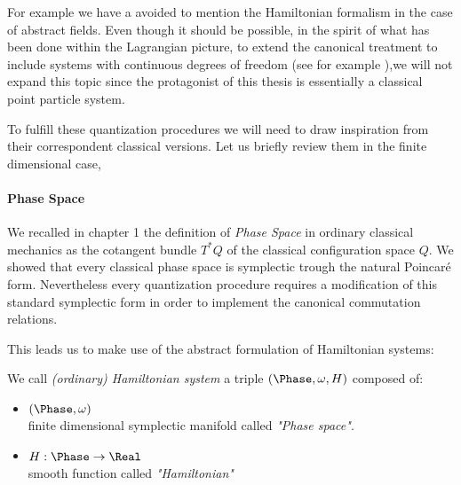 \documentclass[Main]{subfiles}
\begin{document}
	For example we have a avoided to mention the Hamiltonian formalism in the case of abstract fields.
	Even though it should be possible, in the spirit of what has been done within the Lagrangian picture, to extend the canonical treatment to include systems with continuous degrees of freedom (see for example \cite{Giachetta1999}),we will not expand this topic since the protagonist of this thesis is essentially a classical point particle system.
	
	To fulfill these quantization procedures we will need to draw inspiration from their correspondent classical versions.	Let us briefly review them in the finite dimensional case,
	
			\paragraph{Phase Space}
		We recalled in chapter 1 the definition of \emph{Phase Space} in ordinary classical mechanics as the cotangent bundle $T^*Q$ of the classical configuration space $Q$.
		We showed that every classical phase space is symplectic trough the natural Poincaré form.
		Nevertheless  every quantization procedure requires a modification of this standard symplectic form in order to implement the canonical commutation relations.
	
	This leads us to make use of the abstract formulation of Hamiltonian systems\cite{Abraham1978}:
	
	\begin{definition}
			We call \emph{(ordinary) Hamiltonian system} a
			triple $(\Phase,\omega, H )$ composed of:
		\begin{itemize}
			\item $(\Phase,\omega)$ \\ finite dimensional symplectic manifold called \emph{"Phase space"}.
			\item	$ H :\Phase \rightarrow \Real$ \\  smooth function called \emph{"Hamiltonian"}
		\end{itemize}
	\end{definition}
	
\end{document}
